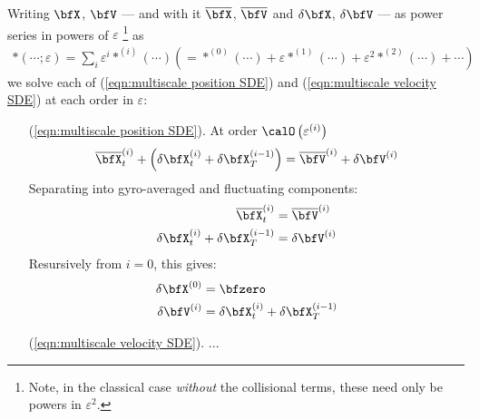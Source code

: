     Writing $\bfX$, $\bfV$ — and with it $\overline{\bfX}$, $\overline{\bfV}$ and $\delta\bfX$, $\delta\bfV$ — as power series in powers of $\varepsilon$ \footnote{Note, in the classical case \emph{without} the collisional terms, these need only be powers in $\varepsilon^{2}$.} as
    \begin{align}
        *(\cdots; \varepsilon)  =  \sum_{i}\varepsilon^{i}*^{(i)}(\cdots)  \left(=  *^{(0)}(\cdots) + \varepsilon*^{(1)}(\cdots) + \varepsilon^{2}*^{(2)}(\cdots) + \cdots\right)
    \end{align}
    we solve each of (\ref{eqn:multiscale position SDE}) and (\ref{eqn:multiscale velocity SDE}) at each order in $\varepsilon$: 
    \begin{itemize}
        \item[(\ref{eqn:multiscale position SDE}).]  At order $\calO\left(\varepsilon^{(i)}\right)$
        \begin{equation}
            \overline{\bfX}^{(i)}_{t} + \left(\delta\bfX^{(i)}_{t} + \delta\bfX^{(i - 1)}_{T}\right)  =  \overline{\bfV}^{(i)} + \delta\bfV^{(i)}
        \end{equation}
        Separating into gyro-averaged and fluctuating components:
        \begin{align}
            \overline{\bfX}^{(i)}_{t}  &=  \overline{\bfV}^{(i)}  \\
            \delta\bfX^{(i)}_{t} + \delta\bfX^{(i - 1)}_{T}  &=  \delta\bfV^{(i)}
        \end{align}
        Resursively from $i = 0$, this gives:
        \begin{align}
            \delta\bfX^{(0)}  &=  \bfzero  \\
            \delta\bfV^{(i)}  &=  \delta\bfX^{(i)}_{t} + \delta\bfX^{(i - 1)}_{T}
        \end{align}
        
        \item[(\ref{eqn:multiscale velocity SDE}).]  ...
    \end{itemize}
    
    